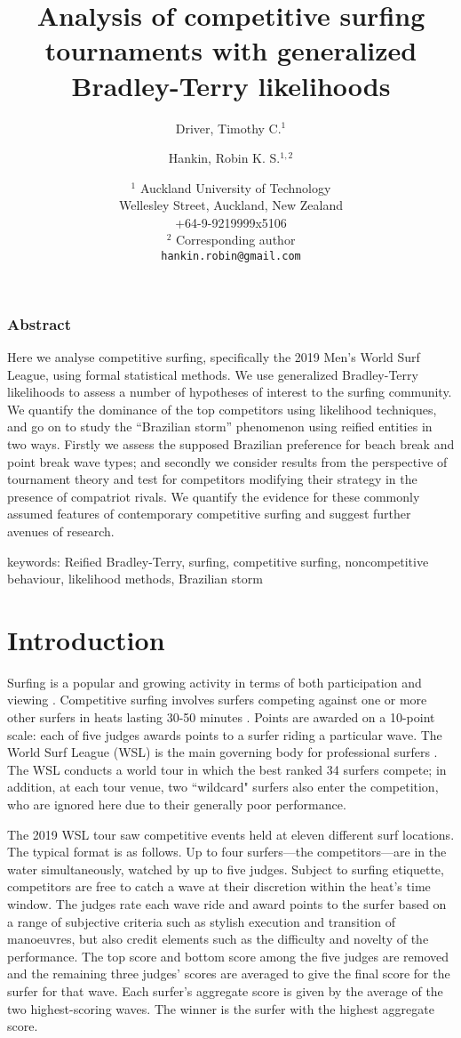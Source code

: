 \documentclass{article}
\author{Driver, Timothy C.${}^{1}$ \and
    Hankin, Robin K. S.${}^{1,2}$}
\date{${}^{1}$ Auckland University of Technology\\
    Wellesley Street, Auckland, New Zealand\\
    +64-9-9219999x5106\\
    ${}^2$ Corresponding author\\
    \texttt{hankin.robin@gmail.com}
  }
\title{Analysis of competitive surfing tournaments with generalized Bradley-Terry likelihoods}
\begin{document}
\maketitle
  
\subsubsection*{Abstract}
Here we analyse competitive surfing, specifically the 2019 Men's World Surf
League, using formal statistical methods.  We use generalized
Bradley-Terry likelihoods to assess a number of hypotheses of interest
to the surfing community.  We quantify the dominance of
the top competitors using likelihood techniques, and go on to study
the ``Brazilian storm'' phenomenon using reified entities in two ways.
Firstly we assess the supposed Brazilian preference for beach break
and point break wave types; and secondly we consider results from the
perspective of tournament theory and test for competitors modifying
their strategy in the presence of compatriot rivals.  We quantify the
evidence for these commonly assumed features of contemporary
competitive surfing and suggest further avenues of research.

keywords: Reified Bradley-Terry, surfing, competitive surfing, noncompetitive behaviour, likelihood methods, Brazilian storm
\newpage

\section{Introduction}

Surfing is a popular and growing activity in terms of both
participation and viewing \citep{warshaw2010}.  Competitive surfing
involves surfers competing against one or more other surfers in heats
lasting 30-50 minutes \citep{booth1995}.  Points are awarded on a
10-point scale: each of five judges awards points to a surfer riding a
particular wave.  The World Surf League (WSL) is the main governing
body for professional surfers \citep{wsl}.  The WSL conducts a world
tour in which the best ranked 34 surfers compete; in addition, at each
tour venue, two ``wildcard" surfers also enter the competition, who
are ignored here due to their generally poor performance.

The 2019 WSL tour saw competitive events held at eleven different surf
locations.  The typical format is as follows.  Up to four
surfers---the competitors---are in the water simultaneously, watched
by up to five judges.  Subject to surfing etiquette, competitors are
free to catch a wave at their discretion within the heat's time
window.  The judges rate each wave ride and award points to the surfer
based on a range of subjective criteria such as stylish execution and
transition of manoeuvres, but also credit elements such as the
difficulty and novelty of the performance.  The top score and bottom
score among the five judges are removed and the remaining three
judges' scores are averaged to give the final score for the surfer for
that wave.  Each surfer's aggregate score is given by the average of
the two highest-scoring waves.  The winner is the surfer with the
highest aggregate score.
\end{document}
